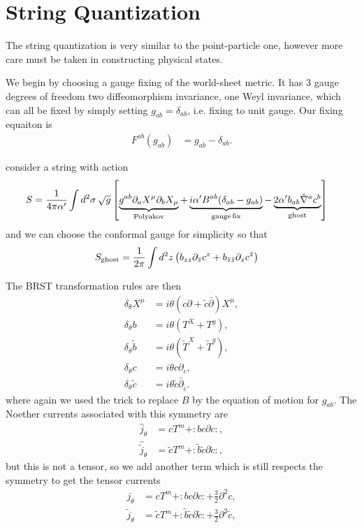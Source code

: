 \documentclass[notitlepage,amsmath,amssymb,aps, pra, 10pt]{revtex4-1}
\begin{document}
\section{String Quantization}
    The string quantization is very similar to the point-particle one, however more care must be taken  in constructing physical states.

    We begin by choosing a gauge fixing of the world-sheet metric. It has 3 gauge degrees of freedom two diffeomorphism invariance, one Weyl invariance, which can all be fixed by simply setting $g_{ab} = \delta_{ab}$, i.e. fixing to unit gauge. Our fixing equaiton is
    \begin{align}
        F^{ab}(g_{ab}) &= g_{ab} - \delta_{ab}.
    \end{align}

    consider a string with action
    \begin{align}
        S &= \frac{1}{4\pi \alpha'} \int d^2\sigma\, \sqrt{g} \left[\underbrace{g^{ab}\partial_a X^{\mu}\partial_b X_{\mu}}_{\rm Polyakov}  +\underbrace{i \alpha ' B^{ab}(\delta_{ab} - g_{ab})}_{\rm gauge\,fix} - \underbrace{2\alpha' b_{ab}\hat\nabla^{a} c^{b}}_{\rm ghost} \right]
    \end{align}
    and we can choose the conformal gauge for simplicity so that
    \begin{align}
        S_{\rm ghost} &= \frac{1}{2\pi}\int d^2z \left( b_{zz} \partial_{\bar{z}} c^{z} + b_{\bar z \bar z} \partial_z c^{\bar z}\right)
    \end{align}

    The BRST transformation rules are then
    \begin{align}
        \delta_{\theta} X^{\mu} &= i \theta (c \partial + \tilde c \bar \partial ) X^{\mu},\\
        \delta_{\theta} b &= i \theta ( T^{X} + T^{g} ) ,\\
        \delta _{\theta} \tilde b &= i \theta (\tilde T^{X} + \tilde T^{g} ),\\
        \delta_{\theta} c &= i \theta c \partial_c,\\
        \delta_{\theta} \tilde c &= i \theta \tilde c \bar \partial_{\tilde c}.
    \end{align}
    where again we used the trick to replace $B$ by the equation of motion for $g_{ab}$. The Noether currents associated with this symmetry are
    \begin{align}
        \hat j_{\theta} &= cT^m +:bc\partial c:,\\
        \hat \tilde j_{\theta} &= \tilde cT^m +:\tilde b\tilde c\partial\tilde c:,
    \end{align}
    but this is not a tensor, so we add another term which is still respects the symmetry to get the tensor currents
    \begin{align}
        j_{\theta} &= cT^m +:bc\partial c: + \frac{3}{2} \partial^2c,\\
        \tilde j_{\theta} &= \tilde cT^m +:\tilde b\tilde c\partial\tilde c: + \frac{3}{2} \partial^2\tilde c,
    \end{align}
\end{document}

